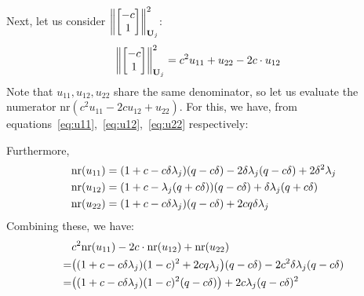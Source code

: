 Next, let us consider $\left\lVert\begin{bmatrix}-c\\1\end{bmatrix}\right\rVert^2_{\mathbf{U}_j}$:
\begin{align*}
\left\lVert\begin{bmatrix}-c\\1\end{bmatrix}\right\rVert^2_{\mathbf{U}_j}&=c^2u_{11}+u_{22}-2c\cdot u_{12}
\end{align*}
Note that $u_{11},u_{12},u_{22}$ share the same denominator, so let us evaluate the numerator $\text{nr}(c^2 u_{11}-2cu_{12}+u_{22})$. For this, we have, from equations~\ref{eq:u11},~\ref{eq:u12},~\ref{eq:u22} respectively:
\iffalse
\begin{align*}
\text{nr}(U_{11})&=\text{nr}(U_{22})(1-2\delta\lambda_j)+\delta^2\lambda_j\text{dr}(U_{22})\\
&=(1+c-c\delta\lambda_j)(\g -c\delta)(1-2\delta\lambda_j)+2c\g \delta\lambda_j(1-2\delta\lambda_j)+2\delta^2\lambda_j(1-c^2+c\lambda_j(\g +c\delta))\\
&=(1+c-c\delta\lambda_j)(\g -c\delta)(1-2\delta\lambda_j)+2\delta^2\lambda_j + 2c\delta\lambda_j(\g -c\delta)(1-\delta\lambda_j)\\
&=(1+c+c\delta\lambda_j)(\g -c\delta)(1-\delta\lambda_j)+2\delta^2\lambda_j-\delta\lambda_j(1+c-c\delta\lambda_j)(\g -c\delta)\\
&=(1+c+c\delta\lambda_j)(\g -c\delta)-2\delta\lambda_j(\g -c\delta)(1+c)+2\delta^2\lambda_j\\
&=(1+c-c\delta\lambda_j)(\g -c\delta)-2\delta\lambda_j(\g -c\delta)+2\delta^2\lambda_j
\end{align*}
\fi
Furthermore, 
\begin{align*}
\text{nr}(u_{11})&=(1+c-c\delta\lambda_j)(q -c\delta)-2\delta\lambda_j(q -c\delta)+2\delta^2\lambda_j\\
\text{nr}(u_{12})&=(1+c-\lambda_j(q +c\delta))(q -c\delta)+\delta\lambda_j(q +c\delta)\\
\text{nr}(u_{22})&=(1+c-c\delta\lambda_j)(q -c\delta)+2cq \delta\lambda_j
\end{align*}
Combining these, we have:
\begin{align*}
&c^2\text{nr}(u_{11})-2c\cdot\text{nr}(u_{12})+\text{nr}(u_{22})\\
=&\big((1+c-c\delta\lambda_j)(1-c)^2+2cq \lambda_j\big)(q -c\delta)-2c^2\delta\lambda_j(q -c\delta)\\
=&\big((1+c-c\delta\lambda_j)(1-c)^2(q -c\delta)\big)+2c\lambda_j(q -c\delta)^2
\end{align*}
